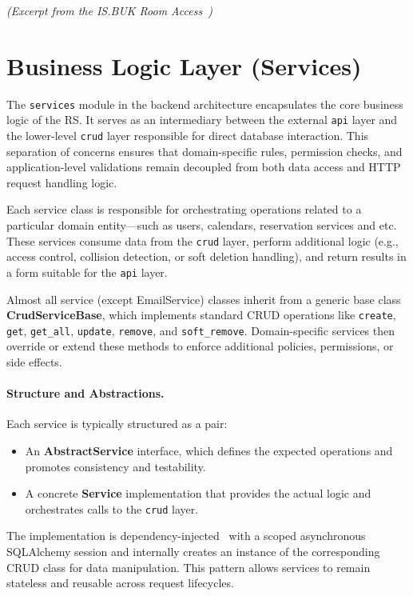 \noindent
\textit{(Excerpt from the IS.BUK Room Access~\cite{ISBUK})}

\section{Business Logic Layer (Services)}

The \texttt{services} module in the backend architecture encapsulates the core business logic of the RS. It serves as an intermediary between the external \texttt{api} layer and the lower-level \texttt{crud} layer responsible for direct database interaction. This separation of concerns ensures that domain-specific rules, permission checks, and application-level validations remain decoupled from both data access and HTTP request handling logic.

Each service class is responsible for orchestrating operations related to a particular domain entity—such as users, calendars, reservation services and etc. These services consume data from the \texttt{crud} layer, perform additional logic (e.g., access control, collision detection, or soft deletion handling), and return results in a form suitable for the \texttt{api} layer.

Almost all service (except EmailService) classes inherit from a generic base class \textbf{CrudServiceBase}, which implements standard CRUD operations like \texttt{create}, \texttt{get}, \texttt{get\_all}, \texttt{update}, \texttt{remove}, and \texttt{soft\_remove}. Domain-specific services then override or extend these methods to enforce additional policies, permissions, or side effects.

\paragraph{Structure and Abstractions.}
Each service is typically structured as a pair:
\begin{itemize}
  \item An \textbf{AbstractService} interface, which defines the expected operations and promotes consistency and testability.
  \item A concrete \textbf{Service} implementation that provides the actual logic and orchestrates calls to the \texttt{crud} layer.
\end{itemize}

The implementation is dependency-injected~\cite{DependencyInjection} with a scoped asynchronous SQLAlchemy session and internally creates an instance of the corresponding CRUD class for data manipulation. This pattern allows services to remain stateless and reusable across request lifecycles.

